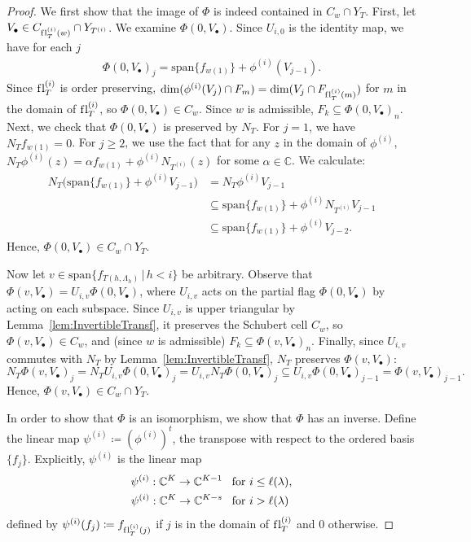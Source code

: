 \documentclass[11pt]{amsart}
\theoremstyle{definition}
\newcommand{\st}{\,|\,}
\newcommand{\vspan}{\mathrm{span}}
\newcommand{\la}{\lambda}
\newcommand{\fl}{\mathrm{f\hspace{0.25pt}l}}
\begin{document}
\begin{proof}
We first show that the image of $\Phi$ is indeed contained in $C_w\cap Y_T$.
First, let $V_\bullet \in C_{\fl_T^{(i)}(w)}\cap Y_{T^{(i)}}$. We examine $\Phi(0, V_\bullet)$. Since $U_{i,0}$ is the identity map, we have for each $j$
\begin{align}
    \Phi(0,V_\bullet)_j =  \vspan\{f_{w(1)}\} + \phi^{(i)}(V_{j-1}).
\end{align}
Since $\fl^{(i)}_{T}$ is order preserving, $\dim(\phi^{(i)}(V_j)\cap F_m)=\dim(V_j\cap F_{\fl^{(i)}_{T}(m)})$ for $m$ in the domain of $\fl_T^{(i)}$, so $\Phi(0,V_\bullet) \in C_w$. Since $w$ is admissible, $F_k \subseteq \Phi(0, V_\bullet)_n$. Next, we check that $\Phi(0, V_\bullet)$ is preserved by $N_T$. For $j=1$, we have $N_Tf_{w(1)} = 0$. For $j \geq 2$, we use the fact that for any $z$ in the domain of $\phi^{(i)}$, $N_T\phi^{(i)}(z)=\alpha f_{w(1)} + \phi^{(i)}N_{T^{(i)}}(z)$ for some $\alpha\in\mathbb{C}$. We calculate:
\begin{align}
    N_T\big(\vspan\{f_{w(1)}\} + \phi^{(i)}V_{j-1}\big) &= N_T \phi^{(i)}V_{j-1} \\
    &\subseteq \vspan\{f_{w(1)}\} +  \phi^{(i)}N_{T^{(i)}}V_{j-1} \\
    &\subseteq \vspan\{f_{w(1)}\} +  \phi^{(i)}V_{j-2}.
\end{align}
Hence, $\Phi(0, V_\bullet) \in C_w \cap Y_T$.

Now let $v\in \vspan\{f_{T(h,\Lambda_h)}\st h<i\}$ be arbitrary. Observe that $\Phi(v,V_\bullet) = U_{i,v}\Phi(0,V_\bullet)$, where $U_{i,v}$ acts on the partial flag $\Phi(0,V_\bullet)$ by acting on each subspace. Since $U_{i,v}$ is upper triangular by Lemma~\ref{lem:InvertibleTransf}, it preserves the Schubert cell $C_w$, so $\Phi(v,V_\bullet)\in C_w$, and (since $w$ is admissible) $F_k \subseteq \Phi(v,V_\bullet)_n$. Finally, since $U_{i,v}$ commutes with $N_T$ by Lemma~\ref{lem:InvertibleTransf}, $N_T$ preserves $\Phi(v, V_\bullet)$:
\begin{equation}
N_T\Phi(v,V_\bullet)_j = N_TU_{i,v}\Phi(0,V_\bullet)_j = U_{i,v}N_T\Phi(0,V_\bullet)_j \subseteq U_{i,v}\Phi(0,V_\bullet)_{j-1} = \Phi(v,V_\bullet)_{j-1}.
\end{equation}
Hence, $\Phi(v, V_\bullet) \in C_w \cap Y_T$.

In order to show that $\Phi$ is an isomorphism, we show that $\Phi$ has an inverse. Define the linear map $\psi^{(i)} \coloneqq (\phi^{(i)})^t$, the transpose with respect to the ordered basis $\{f_j\}$. Explicitly, $\psi^{(i)}$ is the linear map
\begin{align}
    \psi^{(i)} : \bC^K \to \bC^{K-1} & \,\,\,\text{  for  }i\leq \ell(\la),\\
    \psi^{(i)} : \bC^K \to \bC^{K-s} & \,\,\,\text{  for  }i>\ell(\la)
\end{align}
defined by $\psi^{(i)}(f_j) \coloneqq f_{\fl_T^{(i)}(j)}$ if $j$ is in the domain of $\fl_T^{(i)}$ and $0$ otherwise.


\end{proof}
\end{document}
